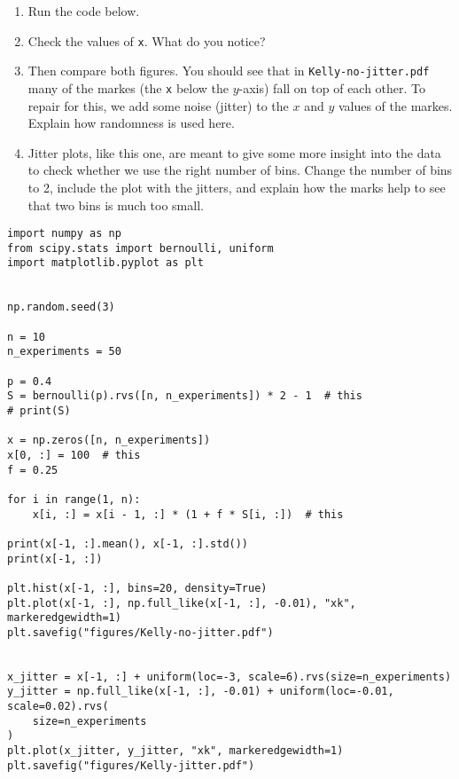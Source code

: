 \begin{exercise}
\begin{enumerate}
\item Run the code below.
\item Check the values of \texttt{x}. What do you notice?
\item Then compare both figures. You should see that in \texttt{Kelly-no-jitter.pdf} many of the markes (the \texttt{x} below the $y$-axis)
fall on top of each other.  To repair for this, we add some noise (jitter) to the $x$ and $y$ values of the markes. Explain how randomness is used here.
\item  Jitter plots, like this one, are meant to give some more insight into the data to check whether we use the right number of bins. Change the number of bins to 2, include the plot with the jitters, and explain how the marks help to see that two bins is much too small.
\end{enumerate}


\begin{verbatim}
import numpy as np
from scipy.stats import bernoulli, uniform
import matplotlib.pyplot as plt


np.random.seed(3)

n = 10
n_experiments = 50

p = 0.4
S = bernoulli(p).rvs([n, n_experiments]) * 2 - 1  # this
# print(S)

x = np.zeros([n, n_experiments])
x[0, :] = 100  # this
f = 0.25

for i in range(1, n):
    x[i, :] = x[i - 1, :] * (1 + f * S[i, :])  # this

print(x[-1, :].mean(), x[-1, :].std())
print(x[-1, :])

plt.hist(x[-1, :], bins=20, density=True)
plt.plot(x[-1, :], np.full_like(x[-1, :], -0.01), "xk", markeredgewidth=1)
plt.savefig("figures/Kelly-no-jitter.pdf")


x_jitter = x[-1, :] + uniform(loc=-3, scale=6).rvs(size=n_experiments)
y_jitter = np.full_like(x[-1, :], -0.01) + uniform(loc=-0.01, scale=0.02).rvs(
    size=n_experiments
)
plt.plot(x_jitter, y_jitter, "xk", markeredgewidth=1)
plt.savefig("figures/Kelly-jitter.pdf")

\end{verbatim}

\end{exercise}



